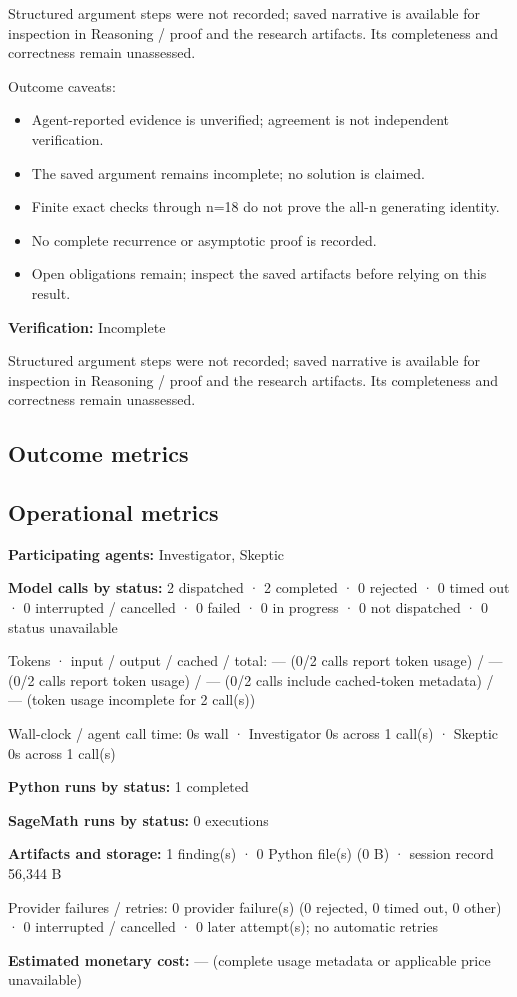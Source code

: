 \documentclass[11pt]{article}
\begin{document}
Structured argument steps were not recorded; saved narrative is available for inspection in Reasoning / proof and the research artifacts. Its completeness and correctness remain unassessed.\par
Outcome caveats:\par
\begin{itemize}
\item Agent-reported evidence is unverified; agreement is not independent verification.
\item The saved argument remains incomplete; no solution is claimed.
\item Finite exact checks through n=18 do not prove the all-n generating identity.
\item No complete recurrence or asymptotic proof is recorded.
\item Open obligations remain; inspect the saved artifacts before relying on this result.
\end{itemize}
\textbf{Verification:} Incomplete\par
Structured argument steps were not recorded; saved narrative is available for inspection in Reasoning / proof and the research artifacts. Its completeness and correctness remain unassessed.\par
\subsection{Outcome metrics}
\subsection{Operational metrics}
\textbf{Participating agents:} Investigator, Skeptic\par
\textbf{Model calls by status:} 2 dispatched · 2 completed · 0 rejected · 0 timed out · 0 interrupted / cancelled · 0 failed · 0 in progress · 0 not dispatched · 0 status unavailable\par
Tokens · input / output / cached / total: — (0/2 calls report token usage) / — (0/2 calls report token usage) / — (0/2 calls include cached-token metadata) / — (token usage incomplete for 2 call(s))\par
Wall-clock / agent call time: 0s wall · Investigator 0s across 1 call(s) · Skeptic 0s across 1 call(s)\par
\textbf{Python runs by status:} 1 completed\par
\textbf{SageMath runs by status:} 0 executions\par
\textbf{Artifacts and storage:} 1 finding(s) · 0 Python file(s) (0 B) · session record 56,344 B\par
Provider failures / retries: 0 provider failure(s) (0 rejected, 0 timed out, 0 other) · 0 interrupted / cancelled · 0 later attempt(s); no automatic retries\par
\textbf{Estimated monetary cost:} — (complete usage metadata or applicable price unavailable)\par
\end{document}

